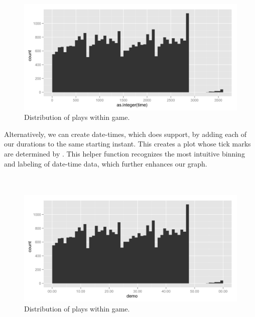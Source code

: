 \documentclass[article]{jss}
\begin{document}
\\

\begin{figure}[htpb]
  \centering
  \includegraphics[width=\textwidth]{play-time-histogram.png}        
  \caption{Distribution of plays within game.}
  \label{fig:plays}
\end{figure}

Alternatively, we can create date-times, which  does support, by adding each of our durations to the same starting instant. This creates a plot whose tick marks are determined by . This helper function recognizes the most intuitive binning and labeling of date-time data, which further enhances our graph.\\

\\
\\

\begin{figure}[htpb]
  \centering
  \includegraphics[width=\textwidth]{play-time-histogram2.png}        
  \caption{Distribution of plays within game.}
  \label{fig:plays}
\end{figure}
\end{document}
